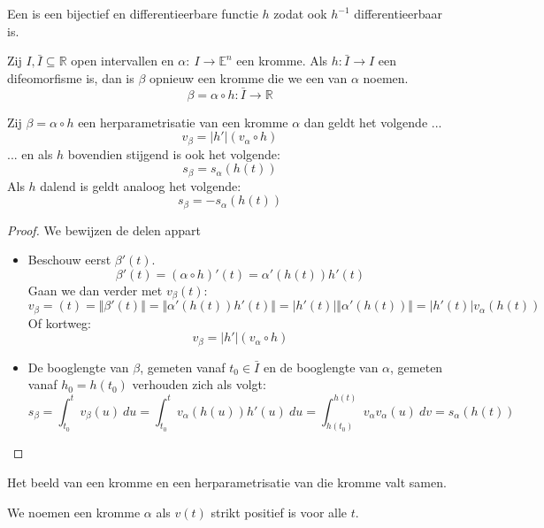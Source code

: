 \documentclass[main.tex]{subfiles}
\begin{document}
\begin{de}
  Een  is een bijectief en differentieerbare functie $h$ zodat ook $h^{-1}$ differentieerbaar is.
\end{de}

\begin{de}
  Zij $I,\bar{I} \subseteq \mathbb{R}$ open intervallen en $\alpha:\ I \rightarrow \mathbb{E}^{n}$ een kromme.
  Als $h: \bar{I} \rightarrow I$ een difeomorfisme is, dan is $\beta$ opnieuw een kromme die we een  van $\alpha$ noemen.
  \[ \beta = \alpha \circ h: \bar{I} \rightarrow \mathbb{R} \]
\end{de}

\begin{st}
  Zij $\beta = \alpha \circ h$ een herparametrisatie van een kromme $\alpha$ dan geldt het volgende ...
  \[ v_{\beta} = |h'|(v_{\alpha} \circ h) \]
  ... en als $h$ bovendien stijgend is ook het volgende:
  \[ s_{\beta} = s_{\alpha}(h(t)) \]
  Als $h$ dalend is geldt analoog het volgende:
  \[ s_{\beta} = -s_{\alpha}(h(t)) \]
  \begin{proof}
    We bewijzen de delen appart
    \begin{itemize}
    \item 
      Beschouw eerst $\beta'(t)$.
      \[ \beta'(t) = (\alpha \circ h)'(t) = \alpha'(h(t)) h'(t) \] Gaan
      we dan verder met $v_{\beta}(t)$:
      \[ v_{\beta}=(t) = \Vert \beta'(t) \Vert = \Vert
      \alpha'(h(t))h'(t) \Vert = |h'(t)|\Vert \alpha'(h(t)) \Vert =
      |h'(t)|v_{\alpha}(h(t)) \] Of kortweg:
      \[ v_{\beta} = |h'|(v_{\alpha} \circ h) \]
    \item 
      De booglengte van $\beta$, gemeten vanaf $t_{0}\in \bar{I}$ en de booglengte van $\alpha$, gemeten vanaf $h_{0} = h(t_{0})$ verhouden zich als volgt:
      \[ s_{\beta} = \int_{t_{0}}^{t}v_{\beta}(u)\ du = \int_{t_{0}}^{t}v_{\alpha}(h(u))h'(u)\ du = \int_{h(t_{0})}^{h(t)}v_{\alpha}v_{\alpha}(u)\ dv = s_{\alpha}(h(t)) \]
    \end{itemize}
  \end{proof}
\end{st}

\begin{opm}
  Het beeld van een kromme en een herparametrisatie van die kromme valt samen.
\end{opm}

\begin{de}
  We noemen een kromme $\alpha$  als $v(t)$ strikt positief is voor alle $t$.
\end{de}
\end{document}
